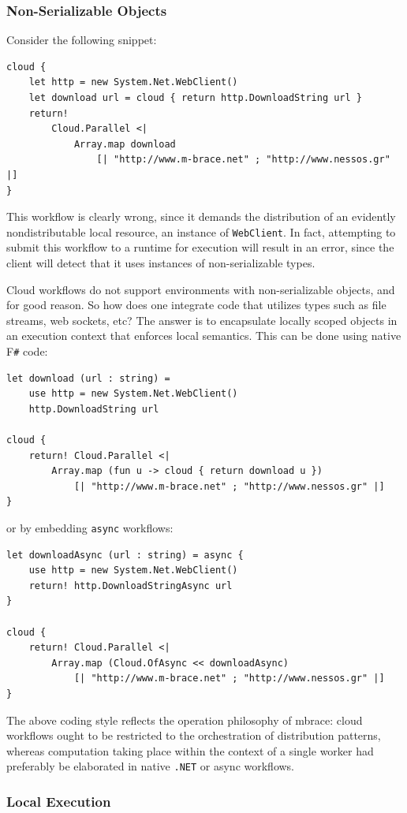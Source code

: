 \documentclass[9pt,a4paper]{article}
\newcommand{\mbrace}{mbrace}
\newcommand{\fsharp}{F\texttt \#}
\newcommand{\dotnet}{\texttt{\hbox{.}NET}}
\begin{document}
\subsubsection*{Non-Serializable Objects}

\noindent Consider the following snippet:
\begin{lstlisting}
cloud {
	let http = new System.Net.WebClient()
	let download url = cloud { return http.DownloadString url }
	return! 
		Cloud.Parallel <| 
			Array.map download 
				[| "http://www.m-brace.net" ; "http://www.nessos.gr" |]
}
\end{lstlisting}
This workflow is clearly wrong, since it demands the distribution of an evidently
nondistributable local resource, an instance of \texttt{WebClient}.
In fact, attempting to submit this workflow to a runtime for execution will result in
an error, since the client will detect that it uses instances of non-serializable 
types.

Cloud workflows do not support environments with non-serializable objects,
and for good reason. So how does one integrate code that utilizes types such
as file streams, web sockets, etc?
%
The answer is to encapsulate locally scoped objects in an execution context
that enforces local semantics. This can be done using native \fsharp{} code:
\begin{lstlisting}
let download (url : string) =
	use http = new System.Net.WebClient()
	http.DownloadString url

cloud {
	return! Cloud.Parallel <|
		Array.map (fun u -> cloud { return download u })
			[| "http://www.m-brace.net" ; "http://www.nessos.gr" |]
}
\end{lstlisting}
or by embedding \texttt{async} workflows:
\begin{lstlisting}
let downloadAsync (url : string) = async {
	use http = new System.Net.WebClient()
	return! http.DownloadStringAsync url
}

cloud {
	return! Cloud.Parallel <|
		Array.map (Cloud.OfAsync << downloadAsync)
			[| "http://www.m-brace.net" ; "http://www.nessos.gr" |]
} 
\end{lstlisting}

The above coding style reflects the operation philosophy of \mbrace:
cloud workflows ought to be restricted to the orchestration of distribution patterns, 
whereas computation taking place within the context of a single worker 
had preferably be elaborated in native \dotnet{} or async workflows.

\subsubsection*{Local Execution}
\end{document}
